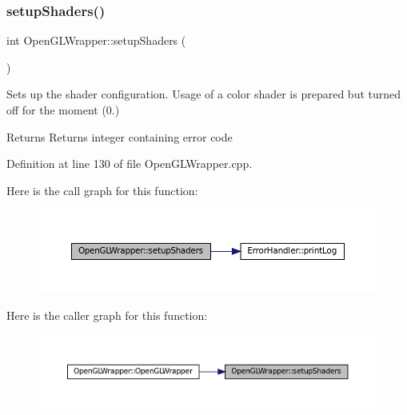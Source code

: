\subsubsection{\texorpdfstring{setupShaders()}{setupShaders()}}
{\footnotesize\ttfamily int Open\+G\+L\+Wrapper\+::setup\+Shaders (\begin{DoxyParamCaption}{ }\end{DoxyParamCaption})\hspace{0.3cm}{\ttfamily [private]}}



Sets up the shader configuration. Usage of a color shader is prepared but turned off for the moment (0.) 

\begin{DoxyReturn}{Returns}
Returns integer containing error code 
\end{DoxyReturn}


Definition at line 130 of file Open\+G\+L\+Wrapper.\+cpp.

Here is the call graph for this function\+:\nopagebreak
\begin{figure}[H]
\begin{center}
\leavevmode
\includegraphics[width=350pt]{classOpenGLWrapper_a122d3908139936926442385921967157_cgraph}
\end{center}
\end{figure}
Here is the caller graph for this function\+:\nopagebreak
\begin{figure}[H]
\begin{center}
\leavevmode
\includegraphics[width=350pt]{classOpenGLWrapper_a122d3908139936926442385921967157_icgraph}
\end{center}
\end{figure}
\mbox{\label{classOpenGLWrapper_a9f2ce92894cb84914b73349c88bb6fef}} 
